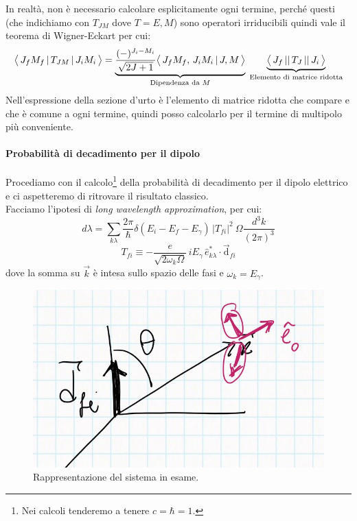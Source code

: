 In realtà, non è necessario calcolare esplicitamente ogni termine, perché questi (che indichiamo con $T_{JM}$ dove $T=E,M$) sono operatori irriducibili quindi vale il teorema di Wigner-Eckart per cui:
$$\bigl\langle\, J_fM_f\, |\,T_{JM}\, |\,J_iM_i\, \bigr\rangle = \underbrace{\frac{(-)^{J_i-M_i}}{\sqrt{2J+1}}\bigl\langle\, J_fM_f,\,J_iM_i\, |\, J,M\, \bigr\rangle}_{\text{Dipendenza da }M}\; \underbrace{\bigl\langle\, J_f\, ||\,T_J\, ||\,J_i\, \bigr\rangle}_\text{Elemento di matrice ridotta}$$
Nell'espressione della sezione d'urto è l'elemento di matrice ridotta che compare e che è comune a ogni termine, quindi posso calcolarlo per il termine di multipolo più conveniente.

\paragraph{Probabilità di decadimento per il dipolo} Procediamo con il calcolo\footnote{Nei calcoli tenderemo a tenere $c=\hbar=1$.} della probabilità di decadimento per il dipolo elettrico e ci aspetteremo di ritrovare il risultato classico.\\
Facciamo l'ipotesi di \textit{long wavelength approximation}, per cui:
$$d\lambda = \sum_{k\lambda} \frac{2\pi}{\hbar} \delta(E_i-E_f-E_\gamma) \,|T_{fi}|^2 \:\Omega \frac{d^3k}{(2\pi)^3}$$
$$T_{fi}\equiv -\frac{e}{\sqrt{2\omega_k \Omega}}\,i E_\gamma \, \hat{e}^*_{k\lambda}\cdot \vec{\mathrm{d}}_{fi}$$
dove la somma su $\vec{k}$ è intesa sullo spazio delle fasi e  $\omega_k = E_\gamma$.
\begin{figure}[h]
    \centering
    \includegraphics[scale=0.2]{Immagini/0310_sistema.png}
    \caption{Rappresentazione del sistema in esame.}
    \label{0310_sist}
\end{figure}
